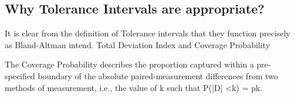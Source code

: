 	\subsection*{Why Tolerance Intervals are appropriate?}
	It is clear from the definition of Tolerance intervals that they function precisely as Bland-Altman intend.
	Total Deviation Index and Coverage Probability
	
	The Coverage Probability describes the proportion captured within a pre-specified boundary of the absolute paired-measurement differences from two methods of measurement, i.e., the value of k such that P(|D| <k) = pk.
	